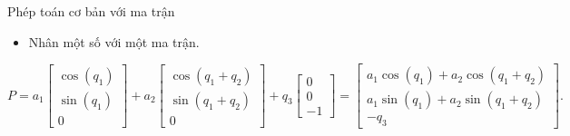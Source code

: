 \begin{frame}{Phép toán cơ bản với ma trận}
    \begin{itemize}
        \item Nhân một số với một ma trận.
    \end{itemize}
    {\footnotesize
    \begin{equation}
        P =
        a_1
        \left[ \begin{array}{c}
            \cos \left( q_1 \right) \\
            \sin \left( q_1 \right) \\
            0
        \end{array} \right]
        +
        a_2
        \left[ \begin{array}{c}
            \cos \left( q_1 + q_2 \right) \\
            \sin \left( q_1 + q_2 \right) \\
            0
        \end{array} \right]
        +
        q_3
        \left[ \begin{array}{c}
            0 \\
            0 \\
            -1
        \end{array} \right]
        =
        \left[ \begin{array}{c}
            a_1 \cos \left( q_1 \right) + a_2 \cos \left( q_1 + q_2 \right) \\
            a_1 \sin \left( q_1 \right) + a_2 \sin \left( q_1 + q_2 \right) \\
            -q_3
        \end{array} \right].
    \end{equation}
    }
    

\end{frame}

